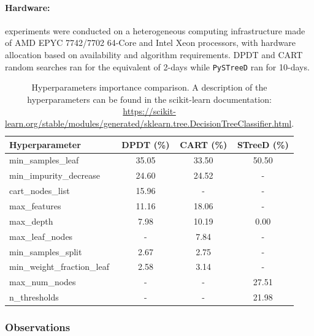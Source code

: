 \paragraph{Hardware:} experiments were conducted on a heterogeneous computing infrastructure made of AMD EPYC 7742/7702 64-Core and Intel Xeon processors, with hardware allocation based on availability and algorithm requirements. DPDT and CART random searches ran for the equivalent of 2-days while \texttt{PySTreeD} ran for 10-days.

\begin{table}
\centering
\small
\caption{Hyperparameters importance comparison. A description of the hyperparameters can be found in the scikit-learn documentation: \url{https://scikit-learn.org/stable/modules/generated/sklearn.tree.DecisionTreeClassifier.html}.}
\begin{tabular}{lccc}
\toprule
\textbf{Hyperparameter} & \textbf{DPDT (\%)}  & \textbf{CART (\%)} & \textbf{STreeD (\%)} \\
\midrule
min\_samples\_leaf & 35.05 & 33.50 & 50.50 \\
min\_impurity\_decrease & 24.60 & 24.52 & - \\
cart\_nodes\_list & 15.96 & - & - \\
max\_features & 11.16 & 18.06 & - \\
max\_depth & 7.98 & 10.19 & 0.00 \\
max\_leaf\_nodes & - & 7.84 & - \\
min\_samples\_split & 2.67 & 2.75 & - \\
min\_weight\_fraction\_leaf & 2.58 & 3.14 & - \\
max\_num\_nodes & - & - & 27.51 \\
n\_thresholds & - & - & 21.98 \\
\bottomrule
\end{tabular}
\label{tab:importance_comparison}
\end{table}

\subsubsection{Observations}

